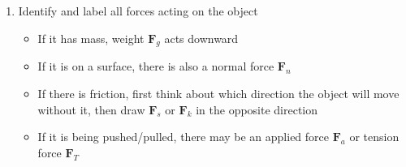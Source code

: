 \begin{enumerate}
%  
%    
%    
%
%
%
%
%
\item Identify and label all forces acting on the object
  \begin{itemize}
  \item If it has mass, weight $\bm F_g$ acts downward
  \item If it is on a surface, there is also a normal force $\bm F_n$
  \item If there is friction, first think about which direction the object will
    move without it, then draw $\bm F_s$ or $\bm F_k$ in the opposite
    direction
  \item If it is being pushed/pulled, there may be an applied force
    $\bm F_a$ or tension force $\bm F_T$
  \end{itemize}


\end{enumerate}
